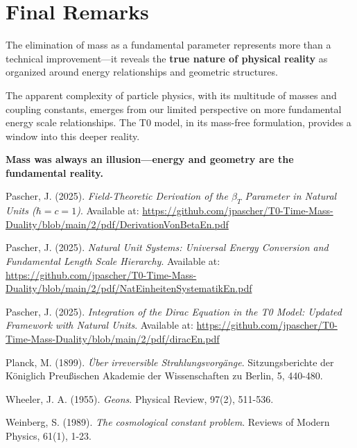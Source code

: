 \documentclass[12pt,a4paper]{article}
\begin{document}
	\section{Final Remarks}
	\label{sec:final_remarks}
	
	The elimination of mass as a fundamental parameter represents more than a technical improvement—it reveals the \textbf{true nature of physical reality} as organized around energy relationships and geometric structures. 
	
	The apparent complexity of particle physics, with its multitude of masses and coupling constants, emerges from our limited perspective on more fundamental energy scale relationships. The T0 model, in its mass-free formulation, provides a window into this deeper reality.
	
	\textbf{Mass was always an illusion—energy and geometry are the fundamental reality.}
	
	\begin{thebibliography}{9}
Pascher, J. (2025). \textit{Field-Theoretic Derivation of the $\beta_T$ Parameter in Natural Units ($\hbar = c = 1$)}. Available at: \url{https://github.com/jpascher/T0-Time-Mass-Duality/blob/main/2/pdf/DerivationVonBetaEn.pdf}

Pascher, J. (2025). \textit{Natural Unit Systems: Universal Energy Conversion and Fundamental Length Scale Hierarchy}. Available at: \url{https://github.com/jpascher/T0-Time-Mass-Duality/blob/main/2/pdf/NatEinheitenSystematikEn.pdf}

Pascher, J. (2025). \textit{Integration of the Dirac Equation in the T0 Model: Updated Framework with Natural Units}. Available at: \url{https://github.com/jpascher/T0-Time-Mass-Duality/blob/main/2/pdf/diracEn.pdf}
		
		Planck, M. (1899). \textit{Über irreversible Strahlungsvorgänge}. Sitzungsberichte der Königlich Preußischen Akademie der Wissenschaften zu Berlin, 5, 440-480.
		
		Wheeler, J. A. (1955). \textit{Geons}. Physical Review, 97(2), 511-536.
		
		Weinberg, S. (1989). \textit{The cosmological constant problem}. Reviews of Modern Physics, 61(1), 1-23.
	\end{thebibliography}
	
\end{document}
